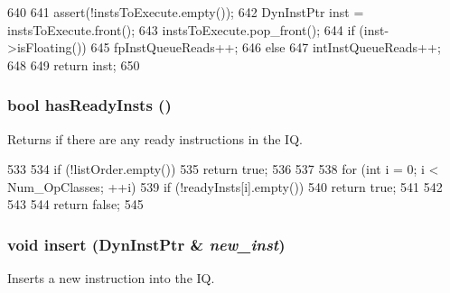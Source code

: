 \begin{DoxyCode}
640 {
641     assert(!instsToExecute.empty());
642     DynInstPtr inst = instsToExecute.front();
643     instsToExecute.pop_front();
644     if (inst->isFloating()){
645         fpInstQueueReads++;
646     } else {
647         intInstQueueReads++;
648     }
649     return inst;
650 }
\end{DoxyCode}
\hypertarget{classInstructionQueue_ae59aad9cee1e45b5817a9d96553e4567}{
\subsubsection[{hasReadyInsts}]{\setlength{\rightskip}{0pt plus 5cm}bool hasReadyInsts ()}}
\label{classInstructionQueue_ae59aad9cee1e45b5817a9d96553e4567}
Returns if there are any ready instructions in the IQ. 


\begin{DoxyCode}
533 {
534     if (!listOrder.empty()) {
535         return true;
536     }
537 
538     for (int i = 0; i < Num_OpClasses; ++i) {
539         if (!readyInsts[i].empty()) {
540             return true;
541         }
542     }
543 
544     return false;
545 }
\end{DoxyCode}
\hypertarget{classInstructionQueue_a786595aecf8ab7aae40868b5ac4a79a7}{
\subsubsection[{insert}]{\setlength{\rightskip}{0pt plus 5cm}void insert ({\bf DynInstPtr} \& {\em new\_\-inst})}}
\label{classInstructionQueue_a786595aecf8ab7aae40868b5ac4a79a7}
Inserts a new instruction into the IQ. 


